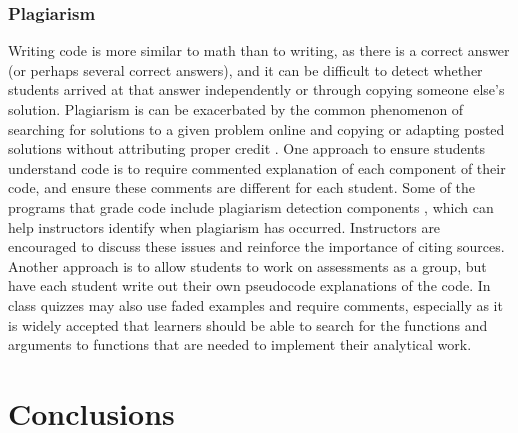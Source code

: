 \subsubsection{Plagiarism}
Writing code is more similar to math than to writing, as there is a correct answer (or perhaps several correct answers), and it can be difficult to detect whether students arrived at that answer independently or through copying someone else's solution.
Plagiarism is can be exacerbated by the common phenomenon of searching for solutions to a given problem online and copying or adapting posted solutions without attributing proper credit \citep{gaspar_restoring_2007}. 
One approach to ensure students understand code is to require commented explanation of each component of their code, and ensure these comments are different for each student.
Some of the programs that grade code include plagiarism detection components \citep{pears_survey_2007}, which can help instructors identify when plagiarism has occurred.
Instructors are encouraged to discuss these issues and reinforce the importance of citing sources.
Another approach is to allow students to work on assessments as a group, but have each student write out their own pseudocode explanations of the code.
In class quizzes may also use faded examples and require comments,
especially as it is widely accepted that learners should be able to search for the functions
and arguments to functions that are needed to implement their analytical work.

\section{Conclusions}

